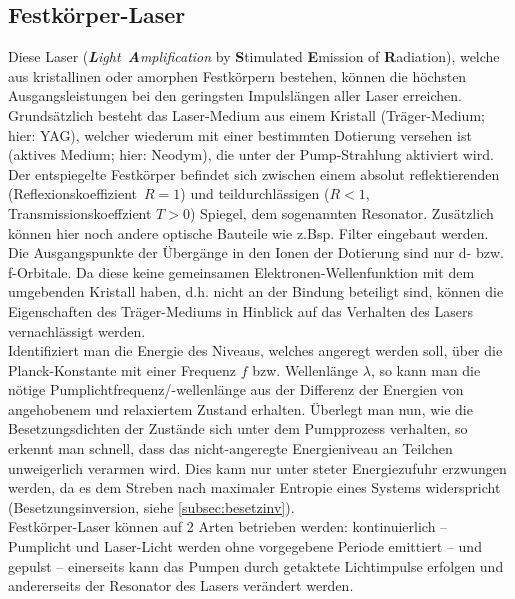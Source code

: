 \documentclass[numbers=noenddot,12pt,a4paper]{scrartcl}
\newcommand{\tilt}[1]{\mbox{\textit{#1}}}
\begin{document}
\subsection{Festkörper-Laser}\label{subsec:fklaser}
Diese Laser (\tilt{\textbf{L}ight \textbf{A}mplification} by \textbf{S}timulated \textbf{E}mission of \textbf{R}adiation), welche aus kristallinen oder amorphen Festkörpern bestehen, können die höchsten Ausgangsleistungen bei den geringsten Impulslängen aller Laser erreichen. Grundsätzlich besteht das Laser-Medium aus einem Kristall (Träger-Medium; hier: YAG), welcher wiederum mit einer bestimmten Dotierung versehen ist (aktives Medium; hier: Neodym), die unter der Pump-Strahlung aktiviert wird. Der entspiegelte Festkörper befindet sich zwischen einem absolut reflektierenden \mbox{(Reflexionskoeffizient $R=1$)} und teildurchlässigen ($R<1$, Transmissionskoeffzient $T>0$) Spiegel, dem sogenannten Resonator. Zusätzlich können hier noch andere optische Bauteile wie z.Bsp. Filter eingebaut werden.\\ Die Ausgangspunkte der Übergänge in den Ionen der Dotierung sind nur d- bzw. f-Orbitale. Da diese keine gemeinsamen Elektronen-Wellenfunktion mit dem umgebenden Kristall haben, d.h. nicht an der Bindung beteiligt sind, können die Eigenschaften des Träger-Mediums in Hinblick auf das Verhalten des Lasers vernachlässigt werden.\\
Identifiziert man die Energie des Niveaus, welches angeregt werden soll, über die Planck-Konstante mit einer Frequenz $f$ bzw. Wellenlänge $\lambda$, so kann man die nötige Pumplichtfrequenz/-wellenlänge aus der Differenz der Energien von angehobenem und relaxiertem Zustand erhalten. Überlegt man nun, wie die Besetzungsdichten der Zustände sich unter dem Pumpprozess verhalten, so erkennt man schnell, dass das nicht-angeregte Energieniveau an Teilchen unweigerlich verarmen wird. Dies kann nur unter steter Energiezufuhr erzwungen werden, da es dem Streben nach maximaler Entropie eines Systems widerspricht (Besetzungsinversion, siehe \ref{subsec:besetzinv}).\\
Festkörper-Laser können auf 2 Arten betrieben werden: kontinuierlich -- Pumplicht und Laser-Licht werden ohne vorgegebene Periode emittiert -- und gepulst -- einerseits kann das Pumpen durch getaktete Lichtimpulse erfolgen und andererseits der Resonator des Lasers verändert werden.
\end{document}
